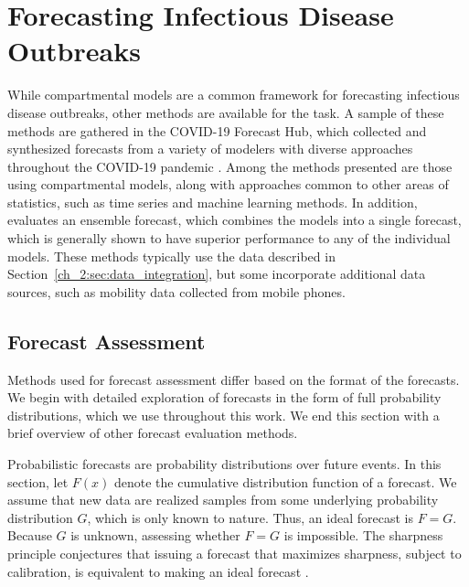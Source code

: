 \section{Forecasting Infectious Disease Outbreaks}
\label{sec:forecasting_techniques_and_assessment}

While compartmental models are a common framework for forecasting infectious disease outbreaks, other methods are available for the task.
A sample of these methods are gathered in the COVID-19 Forecast Hub, which collected and synthesized forecasts from a variety of modelers with diverse approaches throughout the COVID-19 pandemic \citep{Cramer2022Evaluation}.
Among the methods presented are those using compartmental models, along with approaches common to other areas of statistics, such as time series and machine learning methods.
In addition, \citet{Cramer2022Evaluation} evaluates an ensemble forecast, which combines the models into a single forecast, which is generally shown to have superior performance to any of the individual models.
These methods typically use the data described in Section~\ref{ch_2:sec:data_integration}, but some incorporate additional data sources, such as mobility data collected from mobile phones.

\subsection{Forecast Assessment}

Methods used for forecast assessment differ based on the format of the forecasts.
We begin with detailed exploration of forecasts in the form of full probability distributions, which we use throughout this work.
We end this section with a brief overview of other forecast evaluation methods.

Probabilistic forecasts are probability distributions over future events.
In this section, let \( F(x) \) denote the cumulative distribution function of a forecast.
We assume that new data are realized samples from some underlying probability distribution \( G \), which is only known to nature.
Thus, an ideal forecast is \( F = G \).
Because \( G \) is unknown, assessing whether \(F = G\) is impossible.
The sharpness principle conjectures that issuing a forecast that maximizes sharpness, subject to calibration, is equivalent to making an ideal forecast \citep{Gneiting2007Probabilistic}.

